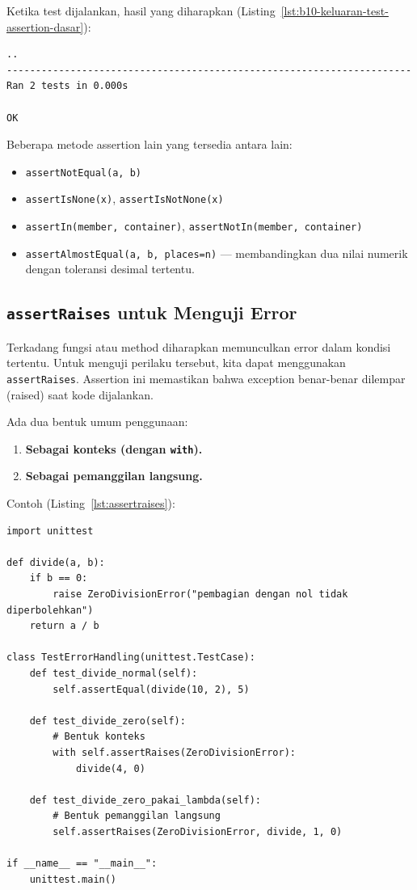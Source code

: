 Ketika test dijalankan, hasil yang diharapkan (Listing~\ref{lst:b10-keluaran-test-assertion-dasar}):

\begin{lstlisting}[language=bash, caption={Keluaran test assertion dasar}, label={lst:b10-keluaran-test-assertion-dasar}]
..
----------------------------------------------------------------------
Ran 2 tests in 0.000s

OK
\end{lstlisting}

Beberapa metode assertion lain yang tersedia antara lain:
\begin{itemize}
    \item \texttt{assertNotEqual(a, b)}
    \item \texttt{assertIsNone(x)}, \texttt{assertIsNotNone(x)}
    \item \texttt{assertIn(member, container)}, \texttt{assertNotIn(member, container)}
    \item \texttt{assertAlmostEqual(a, b, places=n)} — membandingkan dua nilai numerik dengan toleransi desimal tertentu.
\end{itemize}

\subsection{\texttt{assertRaises} untuk Menguji Error}

Terkadang fungsi atau method diharapkan memunculkan error dalam kondisi tertentu.  
Untuk menguji perilaku tersebut, kita dapat menggunakan \texttt{assertRaises}.  
Assertion ini memastikan bahwa exception benar-benar dilempar (raised) saat kode dijalankan.

Ada dua bentuk umum penggunaan:
\begin{enumerate}
    \item \textbf{Sebagai konteks (dengan \texttt{with}).}
    \item \textbf{Sebagai pemanggilan langsung.}
\end{enumerate}

Contoh (Listing~\ref{lst:assertraises}):

\begin{lstlisting}[style=PythonStyle, caption={Contoh penggunaan assertRaises}, label={lst:assertraises}]
import unittest

def divide(a, b):
    if b == 0:
        raise ZeroDivisionError("pembagian dengan nol tidak diperbolehkan")
    return a / b

class TestErrorHandling(unittest.TestCase):
    def test_divide_normal(self):
        self.assertEqual(divide(10, 2), 5)

    def test_divide_zero(self):
        # Bentuk konteks
        with self.assertRaises(ZeroDivisionError):
            divide(4, 0)

    def test_divide_zero_pakai_lambda(self):
        # Bentuk pemanggilan langsung
        self.assertRaises(ZeroDivisionError, divide, 1, 0)

if __name__ == "__main__":
    unittest.main()
\end{lstlisting}

